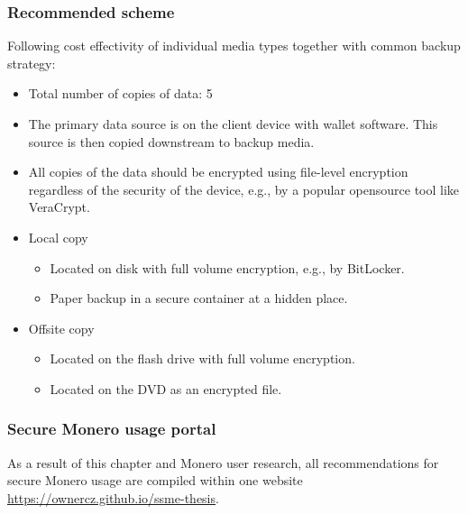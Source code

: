 \documentclass[
  printed, %
  table,   %
  lof,     %
  lot,     %
           oneside, color
]{fithesis3}
\begin{document}
\subsubsection{Recommended scheme}
Following cost effectivity of individual media types together with common backup strategy:
\begin{itemize}
\itemsep0em
\item Total number of copies of data: 5
\item The primary data source is on the client device with wallet software. This source is then copied downstream to backup media.
\item All copies of the data should be encrypted using file-level encryption regardless of the security of the device, e.g., by a popular opensource tool like VeraCrypt.
\item Local copy
\begin{itemize}
\itemsep0em
\item Located on disk with full volume encryption, e.g., by BitLocker.
\item Paper backup in a secure container at a hidden place.
\end{itemize}
\item Offsite copy
\begin{itemize}
\itemsep0em
\item Located on the flash drive with full volume encryption.
\item Located on the DVD as an encrypted file.
\end{itemize}
\end{itemize}

\subsubsection{Secure Monero usage portal}
As a result of this chapter and Monero user research, all recommendations for secure Monero usage are compiled within one website \url{https://ownercz.github.io/ssme-thesis}.

\end{document}
